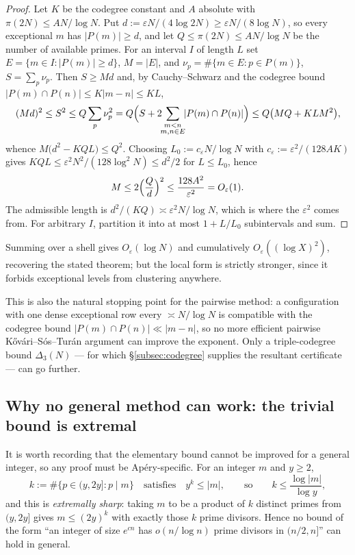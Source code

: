 \begin{proof}
Let $K$ be the codegree constant and $A$ absolute with $\pi(2N)\le AN/\log N$.  Put
$d:=\varepsilon N/(4\log 2N)\ge\varepsilon N/(8\log N)$, so every exceptional $m$ has
$|P(m)|\ge d$, and let $Q\le\pi(2N)\le AN/\log N$ be the number of available primes.  For an
interval $I$ of length $L$ set $E=\{m\in I:|P(m)|\ge d\}$, $M=|E|$, and
$\nu_p=\#\{m\in E:p\in P(m)\}$, $S=\sum_p\nu_p$.  Then $S\ge Md$ and, by Cauchy--Schwarz and the
codegree bound $|P(m)\cap P(n)|\le K|m-n|\le KL$,
\[
  (Md)^2\le S^2\le Q\sum_p\nu_p^2
  =Q\Bigl(S+2\!\!\sum_{\substack{m<n\\ m,n\in E}}\!\!|P(m)\cap P(n)|\Bigr)
  \le Q\bigl(MQ+KLM^2\bigr),
\]
whence $M\bigl(d^2-KQL\bigr)\le Q^2$.  Choosing
$L_0:=c_\varepsilon N/\log N$ with $c_\varepsilon:=\varepsilon^2/(128AK)$ gives
$KQL\le\varepsilon^2N^2/(128\log^2N)\le d^2/2$ for $L\le L_0$, hence
\[
  M\le2\Bigl(\frac Qd\Bigr)^2\le\frac{128A^2}{\varepsilon^2}=O_\varepsilon(1).
\]
The admissible length is $d^2/(KQ)\asymp\varepsilon^2N/\log N$, which is where the
$\varepsilon^2$ comes from.  For arbitrary $I$, partition it into at most $1+L/L_0$ subintervals
and sum.
\end{proof}

Summing over a shell gives $O_\varepsilon(\log N)$ and cumulatively $O_\varepsilon((\log X)^2)$,
recovering the stated theorem; but the local form is strictly stronger, since it forbids
exceptional levels from clustering anywhere.

This is also the natural stopping point for the pairwise method: a configuration with one dense
exceptional row every $\asymp N/\log N$ is compatible with the codegree bound
$|P(m)\cap P(n)|\ll|m-n|$, so no more efficient pairwise K\H ov\'ari--S\'os--Tur\'an argument can
improve the exponent.  Only a triple-codegree bound $\Delta_3(N)$ — for which
\S\ref{subsec:codegree} supplies the resultant certificate — can go further.

\subsection{Why no general method can work: the trivial bound is extremal}

It is worth recording that the elementary bound cannot be improved for a general integer, so any
proof must be Ap\'ery-specific.  For an integer $m$ and $y\ge2$,
\[
  k:=\#\{p\in(y,2y]:p\mid m\}\quad\text{satisfies}\quad y^k\le|m|,
  \qquad\text{so}\qquad k\le\frac{\log|m|}{\log y},
\]
and this is \emph{extremally sharp}: taking $m$ to be a product of $k$ distinct primes from
$(y,2y]$ gives $m\le(2y)^k$ with exactly those $k$ prime divisors.  Hence no bound of the form
``an integer of size $e^{cn}$ has $o(n/\log n)$ prime divisors in $(n/2,n]$'' can hold in general.

